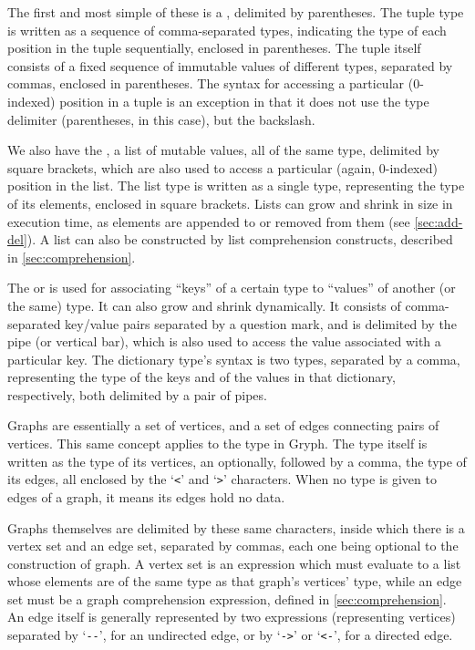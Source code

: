 The first and most simple of these is a , delimited by parentheses. The tuple type is written as a sequence of comma-separated types, indicating the type of each position in the tuple sequentially, enclosed in parentheses. The tuple itself consists of a fixed sequence of immutable values of different types, separated by commas, enclosed in parentheses. The syntax for accessing a particular (0-indexed) position in a tuple is an exception in that it does not use the type delimiter (parentheses, in this case), but the backslash.

We also have the , a list of mutable values, all of the same type, delimited by square brackets, which are also used to access a particular (again, 0-indexed) position in the list. The list type is written as a single type, representing the type of its elements, enclosed in square brackets. Lists can grow and shrink in size in execution time, as elements are appended to or removed from them (see \autoref{sec:add-del}). A list can also be constructed by list comprehension constructs, described in \autoref{sec:comprehension}.

The  or  is used for associating ``keys'' of a certain type to ``values'' of another (or the same) type. It can also grow and shrink dynamically. It consists of comma-separated key/value pairs separated by a question mark, and is delimited by the pipe (or vertical bar), which is also used to access the value associated with a particular key. The dictionary type's syntax is two types, separated by a comma, representing the type of the keys and of the values in that dictionary, respectively, both delimited by a pair of pipes.

Graphs are essentially a set of vertices, and a set of edges connecting pairs of vertices. This same concept applies to the  type in Gryph. The  type itself is written as the type of its vertices, an optionally, followed by a comma, the type of its edges, all enclosed by the `\texttt{<}' and `\texttt{>}' characters. When no type is given to edges of a graph, it means its edges hold no data.

Graphs themselves are delimited by these same characters, inside which there is a vertex set and an edge set, separated by commas, each one being optional to the construction of graph. A vertex set is an expression which must evaluate to a list whose elements are of the same type as that graph's vertices' type, while an edge set must be a graph comprehension expression, defined in \autoref{sec:comprehension}. An edge itself is generally represented by two expressions (representing vertices) separated by `\texttt{-{}-}', for an undirected edge, or by `\texttt{->}' or `\texttt{<-}', for a directed edge.

